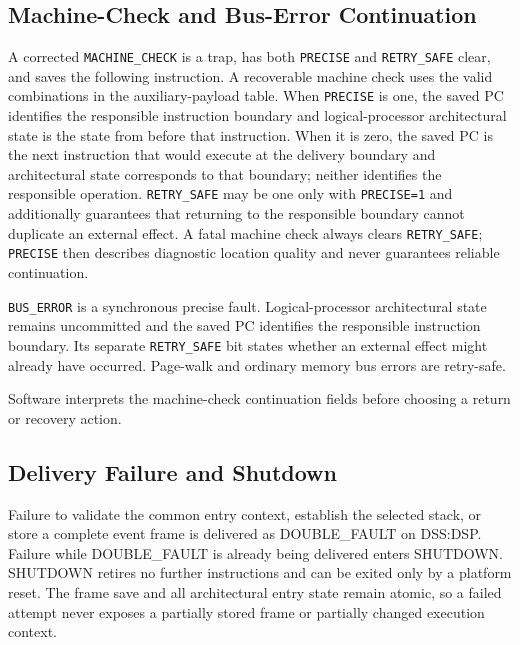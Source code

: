 



\subsection{Machine-Check and Bus-Error Continuation}
A corrected \texttt{MACHINE\_CHECK} is a trap, has both \texttt{PRECISE} and \texttt{RETRY\_SAFE} clear, and saves
the following instruction. A recoverable machine check uses the valid combinations in the auxiliary-payload table.
When \texttt{PRECISE} is one, the saved PC identifies the responsible instruction boundary and logical-processor
architectural state is the state from before that instruction. When it is zero, the saved PC is the next instruction that would
execute at the delivery boundary and architectural state corresponds to that boundary; neither identifies the responsible
operation. \texttt{RETRY\_SAFE} may be one only with \texttt{PRECISE=1} and additionally guarantees that returning
to the responsible boundary cannot duplicate an external effect. A fatal machine check always clears
\texttt{RETRY\_SAFE}; \texttt{PRECISE} then describes diagnostic location quality and never guarantees reliable
continuation.

\texttt{BUS\_ERROR} is a synchronous precise fault. Logical-processor architectural state remains uncommitted and the saved PC
identifies the responsible instruction boundary. Its separate \texttt{RETRY\_SAFE} bit states whether an external
effect might already have occurred. Page-walk and ordinary memory bus errors are retry-safe.

Software interprets the machine-check continuation fields before choosing a return or recovery action.

\subsection{Delivery Failure and Shutdown}
Failure to validate the common entry context, establish the selected stack, or store a complete event frame is
delivered as DOUBLE\_FAULT on DSS:DSP. Failure while DOUBLE\_FAULT is already being delivered enters SHUTDOWN.
SHUTDOWN retires no further instructions and can be exited only by a platform reset.
The frame save and all architectural entry state remain atomic, so a failed attempt never exposes a partially stored
frame or partially changed execution context.

